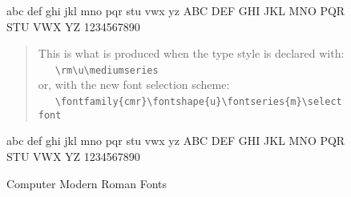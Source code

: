 \begin{figure}
\begin{singlespace}
{\selectfont
abc def ghi jkl mno pqr stu vwx yz ABC DEF GHI JKL MNO PQR STU
VWX YZ 1234567890}\par
\vspace{1em}
\begin{verse}
This is what is produced when the type  style is declared with:\\
\ \ \ \verb+\rm\u\mediumseries+\\
or, with the new font selection scheme:\\
\ \ \ \verb+\fontfamily{cmr}\fontshape{u}\fontseries{m}\selectfont+
\end{verse}
{\selectfont
abc def ghi jkl mno pqr stu vwx yz ABC DEF GHI JKL MNO PQR STU
VWX YZ 1234567890}\par
\vspace{1em}
\caption{Computer Modern Roman Fonts}
\label{fig:cmr}
\end{singlespace}
\end{figure}
 
